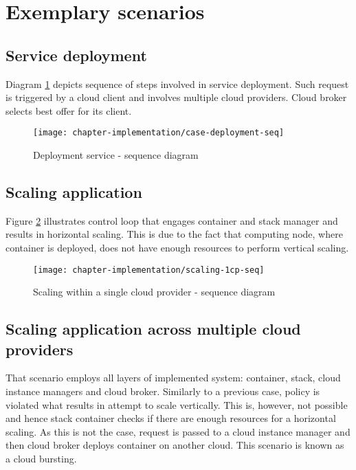 \newpage
\section{Exemplary scenarios}

\subsection{Service deployment}
Diagram \ref{fig:case-deployment-seq} depicts sequence of steps involved in service deployment. Such request is triggered by a cloud client and involves multiple cloud providers. Cloud broker selects best offer for its client.

\begin{figure}[!ht]
  \begin{center}
    \texttt{[image: chapter-implementation/case-deployment-seq]}
  \end{center}
  \caption{Deployment service - sequence diagram}
  \label{fig:case-deployment-seq}
\end{figure}

\subsection{Scaling application}
Figure \ref{fig:scaling-1cp-seq} illustrates control loop that engages container and stack manager and results in horizontal scaling. This is due to the fact that computing node, where container is deployed, does not have enough resources to perform vertical scaling.

\begin{figure}[!ht]
  \begin{center}
    \texttt{[image: chapter-implementation/scaling-1cp-seq]}
  \end{center}
  \caption{Scaling within a single cloud provider - sequence diagram}
  \label{fig:scaling-1cp-seq}
\end{figure}

\subsection{Scaling application across multiple cloud providers}
That scenario employs all layers of implemented system: container, stack, cloud instance managers and cloud broker. Similarly to a previous case, policy is violated what results in attempt to scale vertically. This is, however, not possible and hence stack container checks if there are enough resources for a horizontal scaling. As this is not the case, request is passed to a cloud instance manager and then cloud broker deploys container on another cloud. This scenario is known as a cloud bursting.

